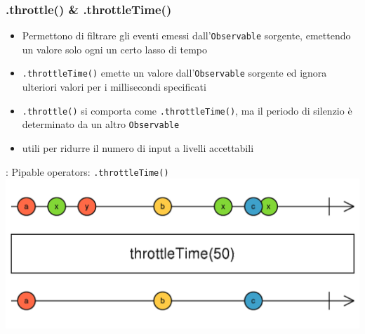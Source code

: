             \subsubsection{.throttle() \& .throttleTime()}\label{subsub:throttle}

            \begin{frame}{\insertsubsectionhead}{}
                \begin{block}{\texttt{\insertsubsubsectionhead}}
                    \begin{itemize}
                        \item
                            Permettono di filtrare gli eventi emessi dall'\texttt{Observable} sorgente, emettendo un valore solo ogni un certo lasso di tempo
                        \item
                            \texttt{.throttleTime()} emette un valore dall'\texttt{Observable} sorgente ed ignora ulteriori valori per i millisecondi specificati
                        \item
                            \texttt{.throttle()} si comporta come \texttt{.throttleTime()}, ma il periodo di silenzio è determinato da un altro \texttt{Observable}
                        \item
                            utili per ridurre il numero di input a livelli accettabili
                    \end{itemize}
                \end{block}
            \end{frame}

            \begin{frame}[fragile]{\insertsubsectionhead}{: Pipable operators: \texttt{.throttleTime()}}
                \includegraphics[width=\linewidth]{throttleTime}
            \end{frame}

